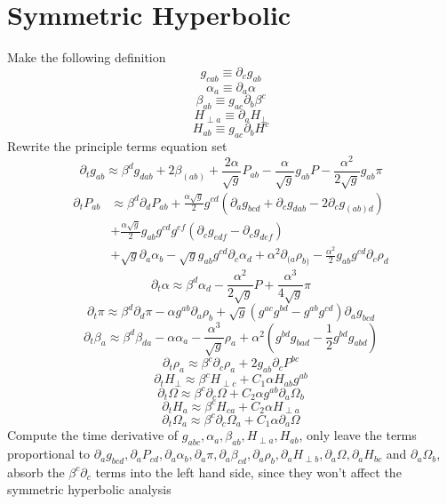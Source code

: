 \documentclass{article}
\begin{document}
\section{Symmetric Hyperbolic}
Make the following definition
\[
g_{cab} \equiv \partial_{c}g_{ab}
\]
\[
\alpha_{a} \equiv \partial_{a}\alpha
\]
\[
\beta_{ab} \equiv g_{ac}\partial_{b}\beta^{c}
\]
\[
H_{\perp a} \equiv \partial_{a}H_{\perp}
\]
\[
H_{ab} \equiv g_{ac}\partial_{b}H^{c}
\]
Rewrite the principle terms equation set
\[
\partial_{t}g_{ab} \approx \beta^{d}g_{dab} + 2\beta_{(ab)} + \frac{2\alpha}{\sqrt{g}}P_{ab} - \frac{\alpha}{\sqrt{g}}g_{ab}P - \frac{\alpha^{2}}{2 \sqrt{g}}g_{ab}\pi
\]
\begin{align*}
\partial_{t}P_{ab} & \approx \beta^{d}\partial_{d}P_{ab} + \frac{\alpha\sqrt{g}}{2}g^{cd}\left(\partial_{a}g_{bcd} + \partial_{c}g_{dab} - 2\partial_{c}g_{(ab)d}\right)\\
& + \frac{\alpha\sqrt{g}}{2}g_{ab}g^{cd}g^{ef}\left(\partial_{c}g_{edf} - \partial_{c}g_{def}\right)\\
& + \sqrt{g}\partial_{a}\alpha_{b} - \sqrt{g}g_{ab}g^{cd}\partial_{c}\alpha_{d} + \alpha^{2}\partial_{(a}\rho_{b)} - \frac{\alpha^2}{2}g_{ab}g^{cd}\partial_{c}\rho_{d} 
\end{align*}
\[
\partial_{t}\alpha \approx \beta^{d}\alpha_{d} -\frac{\alpha^{2}}{2\sqrt{g}}P + \frac{\alpha^{3}}{4\sqrt{g}}\pi
\]
\[
\partial_{t}\pi \approx  \beta^{d}\partial_{d}\pi -\alpha g^{ab}\partial_{a}\rho_{b} + \sqrt{g}\left(g^{ac}g^{bd} - g^{ab}g^{cd}\right)\partial_{a}g_{bcd}
\]
\[
\partial_{t}\beta_{a} \approx \beta^{d}\beta_{da} - \alpha \alpha_{a} - \frac{\alpha^{3}}{\sqrt{g}}\rho_{a} + \alpha^{2}\left(g^{bd}g_{bad} - \frac{1}{2}g^{bd}g_{abd}\right)
\]
\[
\partial_{t}\rho_{a} \approx \beta^{c}\partial_{c}\rho_{a} + 2g_{ab}\partial_{c}P^{bc}
\]
\[
\partial_{t}H_{\perp} \approx \beta^{c}H_{\perp c} + C_{1}\alpha H_{ab}g^{ab} 
\]
\[
\partial_{t}\Omega \approx \beta^{c}\partial_{c}\Omega + C_{2}\alpha g^{ab}\partial_{a}\Omega_{b}
\]
\[
\partial_{t}H_{a} \approx \beta^{c}H_{ca} + C_{2}\alpha H_{\perp a} 
\]
\[
\partial_{t}\Omega_{a} \approx \beta^{c}\partial_{c}\Omega_{a} + C_{1}\alpha \partial_{a}\Omega
\]
Compute the time derivative of $g_{abc}, \alpha_{a}, \beta_{ab}, H_{\perp a}, H_{ab}$, only leave the terms proportional to $\partial_{a}g_{bcd}, \partial_{a}P_{cd}, \partial_{a}\alpha_{b}, \partial_{a}\pi, \partial_{a}\beta_{cd}, \partial_{a}\rho_{b}, \partial_{a}H_{\perp b}, \partial_{a}\Omega, \partial_{a}H_{bc}$ and $\partial_{a}\Omega_{b}$, absorb the $\beta^{c}\partial_{c}$ terms into the left hand side, since they won't affect the symmetric hyperbolic analysis
\end{document}
